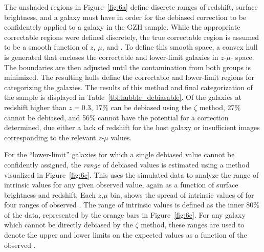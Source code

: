 \documentclass[twocolumn]{aastex6}
\begin{document}
The unshaded regions in Figure~\ref{fig:6a} define discrete ranges of redshift, surface brightness, and \ffeatures{} a galaxy must have in order for the debiased correction to be confidentely applied to a galaxy in the GZH sample. While the appropriate correctable regions were defined discretely, the true correctable region is assumed to be a smooth function of $z$, $\mu$, and \ffeatures{}. To define this smooth space, a convex hull is generated that encloses the correctable and lower-limit \ferengi{} galaxies in $z$-$\mu$-\ffeatures{} space. The boundaries are then adjusted until the contamination from both groups is minimized. The resulting hulls define the correctable and lower-limit regions for categorizing the \hst{} galaxies. The results of this method and final categorization of the \hst{} sample is displayed in Table~\ref{tbl:hubble_debiasable}. Of the galaxies at redshift higher than $z=0.3$, 17\% can be debiased using the $\zeta$ method, 27\% cannot be debiased, and 56\% cannot have the potential for a correction determined, due either a lack of redshift for the host galaxy or insufficient \ferengi{} images corresponding to the relevant $z$-$\mu$ values.

For the ``lower-limit'' galaxies for which a single debiased \ffeatures{} value cannot be confidently assigned, the \emph{range} of debiased values is estimated using a method visualized in Figure~\ref{fig:6c}. This uses the \ferengi{} simulated data to analyze the range of intrinsic \ffeaturesrest{} values for any given observed \ffeatures{} value, again as a function of surface brightness and redshift. Each $z$,$\mu$ bin, shows the spread of intrinsic values of \ffeaturesrest{} for four ranges of observed \ffeatures. The range of intrinsic values is defined as the inner 80\% of the data, represented by the orange bars in Figure~\ref{fig:6c}. For any galaxy which cannot be directly debiased by the $\zeta$ method, these ranges are used to denote the upper and lower limits on the expected values \ffeaturesrest{} as a function of the observed \ffeatures. 
\end{document}
